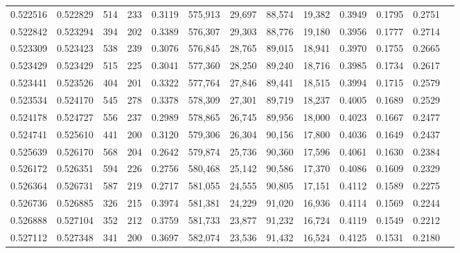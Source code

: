 \begin{tabular}{rrrrrrrrrrrrr}
0.522516 & 0.522829 &   514 &   233 &                                     0.3119 & 575,913 &  29,697 &  88,574 &  19,382 & 0.3949 & 0.1795 & 0.2751 \\
0.522842 & 0.523294 &   394 &   202 &                                     0.3389 & 576,307 &  29,303 &  88,776 &  19,180 & 0.3956 & 0.1777 & 0.2714 \\
0.523309 & 0.523423 &   538 &   239 &                                     0.3076 & 576,845 &  28,765 &  89,015 &  18,941 & 0.3970 & 0.1755 & 0.2665 \\
0.523429 & 0.523429 &   515 &   225 &                                     0.3041 & 577,360 &  28,250 &  89,240 &  18,716 & 0.3985 & 0.1734 & 0.2617 \\
0.523441 & 0.523526 &   404 &   201 &                                     0.3322 & 577,764 &  27,846 &  89,441 &  18,515 & 0.3994 & 0.1715 & 0.2579 \\
0.523534 & 0.524170 &   545 &   278 &                                     0.3378 & 578,309 &  27,301 &  89,719 &  18,237 & 0.4005 & 0.1689 & 0.2529 \\
0.524178 & 0.524727 &   556 &   237 &                                     0.2989 & 578,865 &  26,745 &  89,956 &  18,000 & 0.4023 & 0.1667 & 0.2477 \\
0.524741 & 0.525610 &   441 &   200 &                                     0.3120 & 579,306 &  26,304 &  90,156 &  17,800 & 0.4036 & 0.1649 & 0.2437 \\
0.525639 & 0.526170 &   568 &   204 &                                     0.2642 & 579,874 &  25,736 &  90,360 &  17,596 & 0.4061 & 0.1630 & 0.2384 \\
0.526172 & 0.526351 &   594 &   226 &                                     0.2756 & 580,468 &  25,142 &  90,586 &  17,370 & 0.4086 & 0.1609 & 0.2329 \\
0.526364 & 0.526731 &   587 &   219 &                                     0.2717 & 581,055 &  24,555 &  90,805 &  17,151 & 0.4112 & 0.1589 & 0.2275 \\
0.526736 & 0.526885 &   326 &   215 &                                     0.3974 & 581,381 &  24,229 &  91,020 &  16,936 & 0.4114 & 0.1569 & 0.2244 \\
0.526888 & 0.527104 &   352 &   212 &                                     0.3759 & 581,733 &  23,877 &  91,232 &  16,724 & 0.4119 & 0.1549 & 0.2212 \\
0.527112 & 0.527348 &   341 &   200 &                                     0.3697 & 582,074 &  23,536 &  91,432 &  16,524 & 0.4125 & 0.1531 & 0.2180 \\

\end{tabular}
